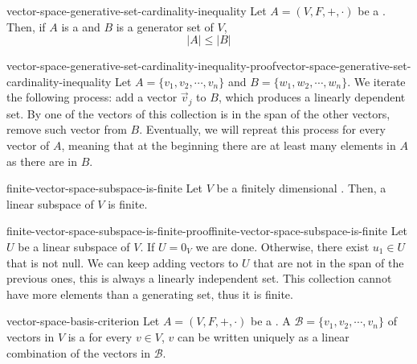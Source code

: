 \documentclass[preview]{standalone}
\begin{document}
\begin{snippettheorem}{vector-space-generative-set-cardinality-inequality}{}
    Let \(A=(V, F, +, \cdot)\) be a \vectorspace.
    Then, if \(A\) is a \linearlyindependent \set and \(B\) is a generator set of \(V\),
    \[
        |A| \leq |B|
    \]
\end{snippettheorem}

\begin{snippetproof}{vector-space-generative-set-cardinality-inequality-proof}{vector-space-generative-set-cardinality-inequality}{}
    Let \(A = \{v_1, v_2, \cdots, v_n\}\)
    and \(B = \{w_1, w_2, \cdots, w_n\}\).
    We iterate the following process:
    add a vector \(\vec{v}_j\) to \(B\), which produces a linearly dependent set.
    By 
    one of the vectors of this collection is in the span of the other vectors,
    remove such vector from \(B\). Eventually, we will repreat this process for every vector of \(A\),
    meaning that at the beginning there are at least many elements in \(A\)
    as there are in \(B\).
\end{snippetproof}

\begin{snippetcorollary}{finite-vector-space-subspace-is-finite}{}
    Let \(V\) be a finitely dimensional \vectorspace. Then,
    a linear subspace of \(V\) is finite.
\end{snippetcorollary}

\begin{snippetproof}{finite-vector-space-subspace-is-finite-proof}{finite-vector-space-subspace-is-finite}{}
    Let \(U\) be a linear subspace of \(V\).
    If \(U={0_V}\) we are done. Otherwise, there exist \(u_1 \in U\) that is not null.
    We can keep adding vectors to \(U\) that are not in the span of the previous ones,
    this is always a linearly independent set.
    This collection cannot have more elements than a generating set, thus it is finite. 
\end{snippetproof}

\begin{snippetproposition}{vector-space-basis-criterion}{}
    Let \(A=(V, F, +, \cdot)\) be a \vectorspace.
    A \set \(\mathcal{B} = \{v_1, v_2, \cdots, v_n\}\)
    of vectors in \(V\) is a \basis \ifandonlyif
    for every \(v\in V\), \(v\) can be written uniquely as a linear combination of the vectors
    in \(\mathcal{B}\).
\end{snippetproposition}
\end{document}

